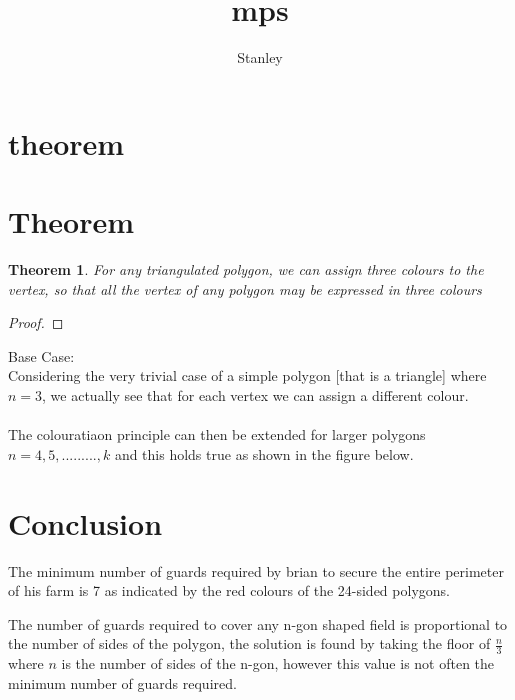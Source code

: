 \documentclass[10pt,a4paper]{article}
\author{Stanley}
\title{mps}
\newtheorem{theorem}{Theorem}[section]
\newtheorem{proof}[theorem]{proof}
\begin{document}
\maketitle

\section{theorem}
\section{Theorem}
\begin{theorem}
For any triangulated polygon, we can assign three colours to the vertex, so that all the vertex of any polygon may be expressed in three colours
\end{theorem}

\begin{proof} 
\end{proof}
Base Case: \\
Considering the very trivial case of a simple polygon [that is a triangle] where $n=3$, we actually see that for each vertex we can assign a different colour.\\
\\
The colouratiaon principle  can then be  extended for larger polygons $n=4,5,.........,k$ and this holds true as shown in the figure below.




\section{Conclusion}
The minimum number of guards required by brian to secure the entire perimeter of his farm is 7 as indicated by the red colours of the 24-sided polygons. 

The number of guards required to cover any n-gon shaped field is proportional to the number of sides of the polygon, the solution is found by taking the floor of $\frac{n}{3}$ where $n$ is the number of sides of the n-gon, however this value is not often the minimum number of guards required.
\end{document}
